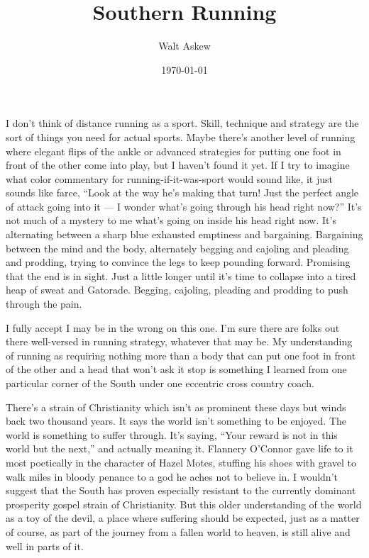 \documentclass[14pt, oneside]{memoir}
\title{Southern Running}
\author{Walt Askew}
\date{\today}
\begin{document}
\maketitle

I don't think of distance running as a sport.
Skill, technique and strategy are the sort of things you need for
actual sports.
Maybe there's another level of running where elegant flips of the
ankle or advanced strategies for putting one foot in front of the
other come into play, but I haven't found it yet.
If I try to imagine what color commentary for running-if-it-was-sport
would sound like, it just sounds like farce,
``Look at the way he's making that turn! Just the perfect angle of
attack going into it --- I wonder what's going through his head right
now?''
It's not much of a mystery to me what's going on inside his head right
now. 
It's alternating between a sharp blue exhausted emptiness and
bargaining.
Bargaining between the mind and the body, alternately begging and
cajoling and pleading and prodding, trying to convince the legs to
keep pounding forward.
Promising that the end is in sight.
Just a little longer until it's time to collapse into a tired heap of
sweat and Gatorade. 
Begging, cajoling, pleading and prodding to push through the pain.

I fully accept I may be in the wrong on this one.
I'm sure there are folks out there well-versed in running strategy,
whatever that may be.
My understanding of running as requiring nothing more than a body that
can put one foot in front of the other and a head that won't ask it
stop is something I learned from one particular corner of the South
under one eccentric cross country coach.

There's a strain of Christianity which isn't as prominent these days
but winds back two thousand years.
It says the world isn't something to be enjoyed.
The world is something to suffer through.
It's saying, ``Your reward is not in this world but the next,'' and
actually meaning it.
Flannery O'Connor gave life to it most poetically in the character of
Hazel Motes, stuffing his shoes with gravel to walk miles in bloody
penance to a god he aches not to believe in.
I wouldn't suggest that the South has proven especially resistant to the
currently dominant prosperity gospel strain of Christianity.
But this older understanding of the world as a toy of the devil, a
place where suffering should be expected, just as a matter of course,
as part of the journey from a fallen world to heaven, is still alive
and well in parts of it.
\end{document}
